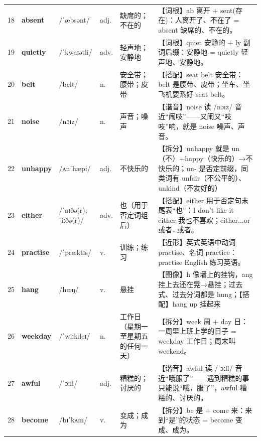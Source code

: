 \documentclass[UTF8,a4paper,11pt,oneside]{ctexbook}
\newcommand{\cellword}[1]{{\bfseries\textcolor{wordcol}{#1}}}
\newcommand{\cellipa}[1]{{\footnotesize\textcolor{ipacol}{#1}}}
\newcommand{\cellpos}[1]{\textcolor{poscol}{#1}}
\newcommand{\cellno}[1]{\textcolor{volcolor!75!black}{#1}}
\begin{document}
{\begin{longtable}{@{}C{0.045\textwidth}L{0.155\textwidth}L{0.175\textwidth}C{0.070\textwidth}L{0.180\textwidth}L{0.282\textwidth}@{}}
\cellno{18} & \cellword{absent} & \cellipa{/ˈæbsənt/} & \cellpos{adj.} & 缺席的；不在的 & \textcolor{tagRoot}{【词根】}ab 离开 + sent(存在)：人离开了、不在了 = absent 缺席的、不在的。 \\
 \cellno{19} & \cellword{quietly} & \cellipa{/ˈkwaɪətli/} & \cellpos{adv.} & 轻声地；安静地 & \textcolor{tagRoot}{【词根】}quiet 安静的 + ly 副词后缀：安静地 = quietly 轻声地、安静地。 \\
\cellno{20} & \cellword{belt} & \cellipa{/belt/} & \cellpos{n.} & 安全带；腰带；皮带 & \textcolor{tagColloc}{【搭配】}seat belt 安全带：belt 是腰带、皮带；坐车、坐飞机要系好 seat belt。 \\
 \cellno{21} & \cellword{noise} & \cellipa{/nɔɪz/} & \cellpos{n.} & 声音；噪声 & \textcolor{tagSound}{【谐音】}noise 读 /nɔɪz/ 音近“闹吱”——又闹又“吱吱”响，就是 noise 噪声、声音。 \\
\cellno{22} & \cellword{unhappy} & \cellipa{/ʌnˈhæpi/} & \cellpos{adj.} & 不快乐的 & \textcolor{tagSplit}{【拆分】}unhappy 就是 un（不）+happy（快乐的）→\allowbreak{}不快乐的；un- 是否定前缀，同类词有 unfair（不公平的）、unkind（不友好的） \\
 \cellno{23} & \cellword{either} & \cellipa{/ˈaɪðə(r); ˈiːðə(r)/} & \cellpos{adv.} & 也（用于否定词组后） & \textcolor{tagColloc}{【搭配】}either 用于否定句末尾表“也”：I don't like it either 我也不喜欢；either...or 或者…或者。 \\
\cellno{24} & \cellword{practise} & \cellipa{/ˈpræktɪs/} & \cellpos{v.} & 训练；练习 & \textcolor{tagNear}{【近形】}英式英语中动词 practise、名词 practice：practise English 练习英语。 \\
 \cellno{25} & \cellword{hang} & \cellipa{/hæŋ/} & \cellpos{v.} & 悬挂 & \textcolor{tagImage}{【图像】}h 像墙上的挂钩，ang 挂上去还在晃→\allowbreak{}悬挂；过去式、过去分词都是 hung；\textcolor{tagColloc}{【搭配】}hang up 挂起来 \\
\cellno{26} & \cellword{weekday} & \cellipa{/ˈwiːkdeɪ/} & \cellpos{n.} & 工作日（星期一至星期五的任何一天） & \textcolor{tagSplit}{【拆分】}week 周 + day 日：一周里上班上学的日子 = weekday 工作日；周末叫 weekend。 \\
 \cellno{27} & \cellword{awful} & \cellipa{/ˈɔːfl/} & \cellpos{adj.} & 糟糕的；讨厌的 & \textcolor{tagSound}{【谐音】}awful 读 /ˈɔːfl/ 音近“哦服了”——遇到糟糕的事只能说“哦，服了”，awful 糟糕的、讨厌的。 \\
\cellno{28} & \cellword{become} & \cellipa{/bɪˈkʌm/} & \cellpos{v.} & 变成；成为 & \textcolor{tagSplit}{【拆分】}be 是 + come 来：来到“是”的状态 = become 变成、成为。 \\

\end{longtable}}
\end{document}
